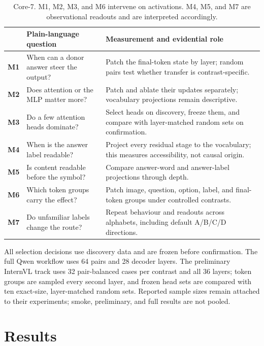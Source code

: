 \documentclass[11pt]{article}
\newcommand{\method}[1]{\textbf{M#1}}
\begin{document}
\begin{table}[t]
\centering
\begin{tabularx}{\textwidth}{@{}l p{} X@{}}
\toprule
 & Plain-language question & Measurement and evidential role \\
\midrule
\method{1} & When can a donor answer steer the output? & Patch the final-token
state by layer; random pairs test whether transfer is contrast-specific. \\
\method{2} & Does attention or the MLP matter more? & Patch and ablate their
updates separately; vocabulary projections remain descriptive. \\
\method{3} & Do a few attention heads dominate? & Select heads on discovery,
freeze them, and compare with layer-matched random sets on confirmation. \\
\method{4} & When is the answer label readable? & Project every residual stage
to the vocabulary; this measures accessibility, not causal origin. \\
\method{5} & Is content readable before the symbol? & Compare answer-word and
answer-label projections through depth. \\
\method{6} & Which token groups carry the effect? & Patch image, question,
option, label, and final-token groups under controlled contrasts. \\
\method{7} & Do unfamiliar labels change the route? & Repeat behaviour and
readouts across alphabets, including default A/B/C/D directions. \\
\bottomrule
\end{tabularx}
\caption{Core-7. M1, M2, M3, and M6 intervene on activations. M4, M5, and M7
are observational readouts and are interpreted accordingly.}
\label{tab:core7}
\end{table}

All selection decisions use discovery data and are frozen before confirmation.
The full Qwen workflow uses 64 pairs and 28 decoder layers. The preliminary
InternVL track uses 32 pair-balanced cases per contrast and all 36 layers;
token groups are sampled every second layer, and frozen head sets are compared
with ten exact-size, layer-matched random sets. Reported sample sizes remain
attached to their experiments; smoke, preliminary, and full results are not
pooled.

\section{Results}
\end{document}
